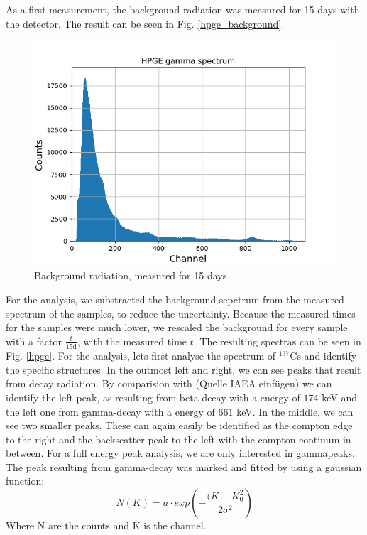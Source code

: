 As a first measurement, the background radiation was measured for 15 days with the detector.
The result can be seen in Fig. \ref{hpge_background}
\begin{figure}[h]
  \includegraphics[width=\linewidth]{../Plots/hgpe_untergrund.png}
  \caption{Background radiation, measured for 15 days}
  \label{hpge_untergrund}
\end{figure}
For the analysis, we substracted the background sepctrum from the measured spectrum of the samples, to reduce the uncertainty.
Because the measured times for the samples were much lower, we rescaled the background for every sample with a factor $\frac{t}{15 \text{d}}$, with the measured time $t$. 
The resulting spectras can be seen in Fig. \ref{hpge}.
For the analysis, lets first analyse the spectrum of $^{137}$Cs and identify the specific structures.
In the outmost left and right, we can see peaks that result from decay radiation.
By comparision with (Quelle IAEA einfügen) we can identify the left peak, as resulting from beta-decay with a energy of $174$ keV and the left one from gamma-decay with a energy of $661$ keV.
In the middle, we can see two smaller peaks. These can again easily be identified as the compton edge to the right and the backscatter peak to the left with the compton contiuum in between.
For a full energy peak analysis, we are only interested in gammapeaks. 
The peak resulting from gamma-decay was marked and fitted by using a gaussian function:
\begin{equation}
N(K) = a \cdot exp \left( - \frac{(K - K_{0}^{2}}{2 \sigma ^{2}} \right)
\end {equation}
Where N are the counts and K is the channel.
